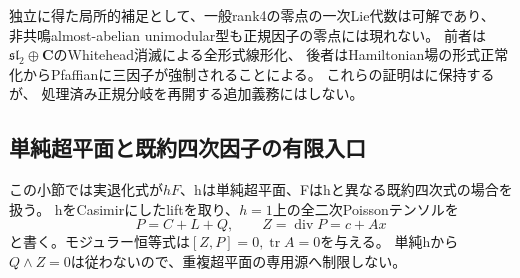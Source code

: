 \documentclass[a4paper,11pt]{ltjsarticle}
\theoremstyle{definition}
\newcommand{\CC}{\mathbf C}
\begin{document}
独立に得た局所的補足として、一般rank4の零点の一次Lie代数は可解であり、
非共鳴almost-abelian unimodular型も正規因子の零点には現れない。
前者は$\mathfrak{sl}_2\oplus\CC$のWhitehead消滅による全形式線形化\cite{zunglevi}、
後者はHamiltonian場の形式正常化からPfaffianに三因子が強制されることによる。
これらの証明はに保持するが、
処理済み正規分岐を再開する追加義務にはしない。

\subsection{単純超平面と既約四次因子の有限入口}
この小節では実退化式が$hF$、hは単純超平面、Fはhと異なる既約四次式の場合を扱う。
hをCasimirにしたliftを取り、$h=1$上の全二次Poissonテンソルを
\[
 P=C+L+Q,\qquad Z=\operatorname{div}P=c+Ax
\]
と書く。モジュラー恒等式は$[Z,P]=0,\operatorname{tr}A=0$を与える。
単純hから$Q\wedge Z=0$は従わないので、重複超平面の専用源へ制限しない。
\end{document}
